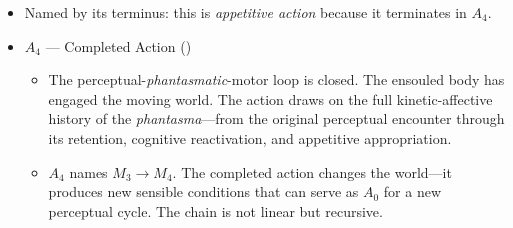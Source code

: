 \begin{itemize}
\begin{itemize}
\begin{itemize}
\begin{itemize}
                  $A_3$ (\textit{DA} III.10, 433b10--18).
                  \item Moved Mover: appetite / desire ( /
                  \textit{orexis})---``that which at once moves and is moved''
                  (433b17--18); ``appetite in the sense of actual appetite
                  \textit{is} a kind of movement'' (433b18).
                  \item That Which is Moved: the animal via the bodily
                  instrument---the ball-and-socket joint where ``pushing and
                  pulling'' execute the action (433b21--25).
                  \item Time ($T_3 \rightarrow T_4$): the interval between the
                  formation of desire and the completion of the motor act.
              \end{itemize}
              \item Named by its terminus: this is \textit{appetitive action}
              because it terminates in $A_4$.


          \end{itemize}
      \end{itemize}
  \end{itemize}

  \begin{itemize}
      \item $A_4$ --- Completed Action ()
      \begin{itemize}
          \item The perceptual-\textit{phantasmatic}-motor loop is closed. The
          ensouled body has engaged the moving world. The action draws on the full
          kinetic-affective history of the \textit{phantasma}---from the original
          perceptual encounter through its retention, cognitive
          reactivation, and appetitive appropriation.
          \item $A_4$ names $M_3 \rightarrow M_4$. The completed action changes the
          world---it produces new sensible conditions that can serve as $A_0$ for a
          new perceptual cycle. The chain is not linear but recursive.
      \end{itemize}
  \end{itemize}
